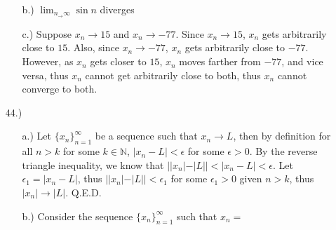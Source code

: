 \documentclass[12pt]{article}
\begin{document}
\begin{itemize}
\begin{itemize}
        \item [b.)] $\displaystyle\lim_{n_\to\infty}\sin n$ diverges

        \item [c.)] Suppose $x_n\to15$ and $x_n\to-77$. Since $x_n\to15$, $x_n$ gets arbitrarily close to $15$. Also, since $x_n\to-77$, $x_n$ gets arbitrarily close to $-77$. However, as $x_n$ gets closer to $15$, $x_n$ moves farther from $-77$, and vice versa, thus $x_n$ cannot get arbitrarily close to both, thus $x_n$ cannot converge to both.
    \end{itemize}

    \item [44.)] \begin{itemize}
        \item [a.)] Let $\{x_n\}^\infty_{n=1}$ be a sequence such that $x_n\to L$, then by definition for all $n>k$ for some $k\in\mathbb{N}$, $\vert x_n-L\vert<\epsilon$ for some $\epsilon>0$. By the reverse triangle inequality, we know that $\Big\vert\vert x_n\vert-\vert L\vert\Big\vert<\vert x_n-L\vert<\epsilon$. Let $\epsilon_1=\vert x_n-L\vert$, thus $\Big\vert\vert x_n\vert-\vert L\vert\Big\vert<\epsilon_1$ for some $\epsilon_1>0$ given $n>k$, thus $\vert x_n\vert\to\vert L\vert$. Q.E.D.

        \item [b.)] Consider the sequence $\{x_n\}^\infty_{n=1}$ such that $x_n=$
    \end{itemize}

\end{itemize}
\end{document}
